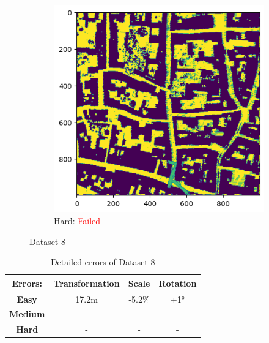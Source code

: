 \documentclass[11pt]{article}
\begin{document}
\begin{figure}[p]
        \vspace{1em}

        \begin{subfigure}{0.45\textwidth}
            \centering
            \includegraphics[width=\linewidth]{images/full/hard/5_7_2_hard}
            \caption{Hard: \textcolor{red}{Failed}}
            \label{fig:5_7_2_hard}
        \end{subfigure}
        \hfill

        \caption{Dataset 8}
        \label{fig:res_5_7_2}
    \end{figure}

    \begin{table}[p]
        \centering
        \begin{tabular}{|c|c|c|c|}
          \hline
          \textbf{Errors:} & \textbf{Transformation} & \textbf{Scale} & \textbf{Rotation} \\
          \hline
          \textbf{Easy}   & 17.2m  & -5.2\% & +1° \\
          \hline
          \textbf{Medium} & -  & - & - \\
          \hline
          \textbf{Hard}   & -  & - & - \\
          \hline
        \end{tabular}
        \caption{Detailed errors of Dataset 8}
        \label{tab:tab_8}
    \end{table}
\end{document}

